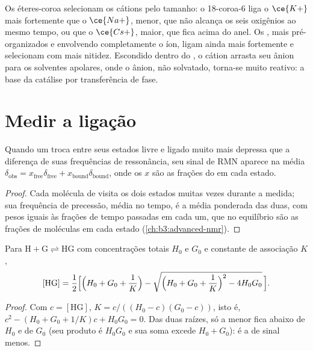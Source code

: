 Os éteres-coroa selecionam os cátions pelo tamanho: o 18-coroa-6 liga o $\ce{K+}$ mais fortemente que o
$\ce{Na+}$, menor, que não alcança os seis oxigênios ao mesmo tempo, ou que o $\ce{Cs+}$, maior, que
fica acima do anel. Os , mais pré-organizados e envolvendo completamente o íon,
ligam ainda mais fortemente e selecionam com mais nitidez. Escondido dentro
do , o cátion arrasta seu ânion para os solventes apolares, onde o ânion,
não solvatado, torna-se muito reativo: a base da catálise por transferência de fase.

\section{Medir a ligação}

\begin{proposition}\label{prop:b3:supramolecular:fast-exchange}
Quando um  troca entre seus estados livre e ligado muito mais depressa que a
diferença de suas frequências de ressonância, seu sinal de RMN aparece na média
$\delta_{\mathrm{obs}} = x_{\mathrm{free}}\delta_{\mathrm{free}} + x_{\mathrm{bound}}\delta_{\mathrm{bound}}$, onde os $x$ são as frações do  em cada estado.
\end{proposition}

\begin{proof}
Cada molécula de  visita os dois estados muitas vezes durante a medida; sua
frequência de precessão, média no tempo, é a média ponderada das duas, com
pesos iguais às frações de tempo passadas em cada um, que no equilíbrio são as
frações de moléculas em cada estado (\cref{ch:b3:advanced-nmr}).
\end{proof}

\begin{theorem}\label{thm:b3:supramolecular:isotherm}
Para $\mathrm{H + G \rightleftharpoons HG}$ com concentrações totais $H_0$ e $G_0$ e constante de associação $K$,
\[
  [\mathrm{HG}] = \frac{1}{2}\Bigl[\Bigl(H_0 + G_0 + \frac1K\Bigr) - \sqrt{\Bigl(H_0 + G_0 + \frac1K\Bigr)^2 - 4H_0G_0}\,\Bigr].
\]
\end{theorem}

\begin{proof}
Com $c = [\mathrm{HG}]$, $K = c/((H_0 - c)(G_0 - c))$, isto é, $c^2 - (H_0 + G_0 + 1/K)c + H_0G_0 = 0$. Das duas raízes,
só a menor fica abaixo de $H_0$ e de $G_0$ (seu produto é $H_0G_0$ e sua soma
excede $H_0 + G_0$): é a de sinal menos.
\end{proof}

